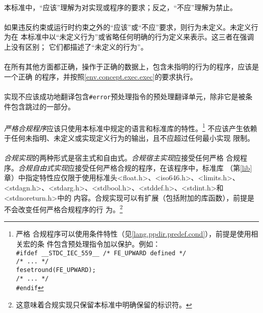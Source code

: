 
\paragraph{}
本标准中，``应该''理解为对实现或程序的要求；反之，``不应''理解为禁止。

\paragraph{}
如果违反约束或运行时约束之外的``应该''或``不应''要求，则行为未定义。未定义行为在
本标准中以``未定义行为''或省略任何明确的行为定义来表示。这三者在强调上没有区别；
它们都描述了``未定义的行为''。

\paragraph{}
在所有其他方面都正确，操作于正确的数据上，包含未指明的行为的程序，应该是一个正确
的程序，并按照\ref{env.concept.exec.exec}的要求执行。

\paragraph{}
实现不应该成功地翻译包含\texttt{\#error}预处理指令的预处理翻译单元，除非它是被条
件包含跳过的一部分。

\paragraph{}
\textit{严格合规程序}应该只使用本标准中规定的语言和标准库的特性。\footnote{严格
合规程序可以使用条件特性（见\ref{lang.ppdir.predef.cond}），前提是使用相关宏的条
件包含预处理指令加以保护。例如：                                              \\
\mbox{\qquad\texttt{\#ifdef \_\_STDC\_IEC\_559\_\_ /* FE\_UPWARD defined */}} \\
\mbox{\qquad\qquad\texttt{/* ... */}}                                         \\
\mbox{\qquad\qquad\texttt{fesetround(FE\_UPWARD);}}                           \\
\mbox{\qquad\qquad\texttt{/* ... */}}                                         \\
\mbox{\qquad\texttt{\#endif}}
} 不应该产生依赖于任何未指明、未定义或实现定义行为的输出，且不应超过任何最小实现
限制。

\paragraph{}
\textit{合规实现}的两种形式是宿主式和自由式。\textit{合规宿主实现}应接受任何严格
合规程序。\textit{合规自由式实现}应接受任何严格合规的程序，在该程序中，标准库
（第\ref{lib}章）中指定特性应仅限于使用标准头<float.h>、<iso646.h>、<limits.h>、
<stdagn.h>、<stdarg.h>、<stdbool.h>、<stddef.h>、<stdint.h>和<stdnoreturn.h>中的
内容。合规实现可以有扩展（包括附加的库函数），前提是不会改变任何严格合规程序的行
为。\footnote{这意味着合规实现只保留本标准中明确保留的标识符。}

